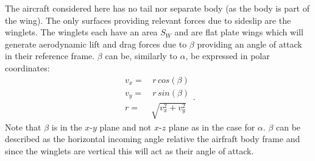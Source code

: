 The aircraft considered here has no tail nor separate body (as the body is part of the wing).
The only surfaces providing relevant forces due to sideslip are the winglets.
The winglets each have an area $S_W$ and are flat plate wings which will generate aerodynamic lift and drag forces due to $\beta$ providing an angle of attack in their reference frame.
$\beta$ can be, similarly to $\alpha$, be expressed in polar coordinates:
\begin{equation}\begin{split}
    v_x =& \, r \, cos(\beta) \\
    v_y =& \, r \, sin(\beta) \\
    r =& \sqrt{v_x^2 + v_y^2}
\end{split}.
\end{equation}
Note that $\beta$ is in the $x$-$y$ plane and not $x$-$z$ plane as in the case for $\alpha$.
$\beta$ can be described as the horizontal incoming angle relative the airfraft body frame and since the winglets are vertical this will act as their angle of attack.


